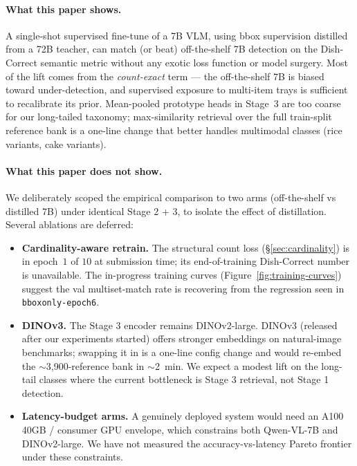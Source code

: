 \paragraph{What this paper shows.} A single-shot supervised fine-tune of a 7B
VLM, using bbox supervision distilled from a 72B teacher, can match (or beat)
off-the-shelf 7B detection on the Dish-Correct semantic metric without any
exotic loss function or model surgery. Most of the lift comes from the
\emph{count-exact} term --- the off-the-shelf 7B is biased toward
under-detection, and supervised exposure to multi-item trays is sufficient
to recalibrate its prior. Mean-pooled prototype heads in Stage~3 are too
coarse for our long-tailed taxonomy; max-similarity retrieval over the full
train-split reference bank is a one-line change that better handles
multimodal classes (rice variants, cake variants).

\paragraph{What this paper does not show.} We deliberately scoped the
empirical comparison to two arms (off-the-shelf vs distilled 7B) under
identical Stage 2 + 3, to isolate the effect of distillation. Several
ablations are deferred:

\begin{itemize}\itemsep1pt
  \item \textbf{Cardinality-aware retrain.} The structural count loss
    (\S\ref{sec:cardinality}) is in epoch~$1$ of $10$ at submission time;
    its end-of-training Dish-Correct number is unavailable. The
    in-progress training curves (Figure~\ref{fig:training-curves}) suggest
    the val multiset-match rate is recovering from the regression seen in
    \texttt{bboxonly-epoch6}.
  \item \textbf{DINOv3.} The Stage 3 encoder remains DINOv2-large.
    DINOv3 (released after our experiments started) offers stronger
    embeddings on natural-image benchmarks; swapping it in is a one-line
    config change and would re-embed the $\sim$3{,}900-reference bank in
    $\sim$2~min. We expect a modest lift on the long-tail classes where
    the current bottleneck is Stage 3 retrieval, not Stage 1 detection.
  \item \textbf{Latency-budget arms.} A genuinely deployed system would
    need an A100 40GB / consumer GPU envelope, which constrains both
    Qwen-VL-7B and DINOv2-large. We have not measured the
    accuracy-vs-latency Pareto frontier under these constraints.
\end{itemize}

